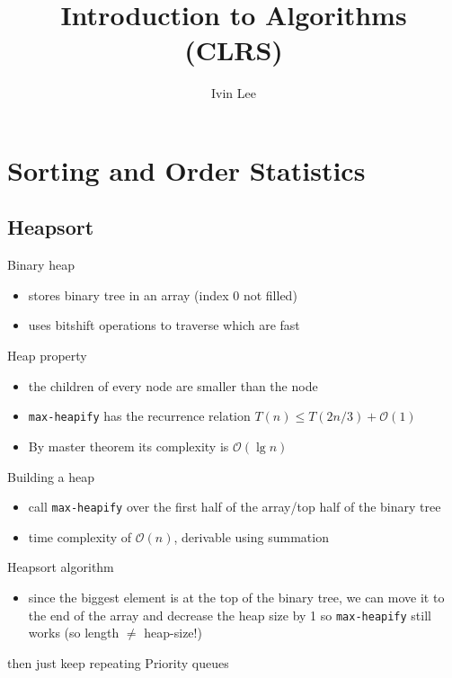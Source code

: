 \documentclass[12pt,a4paper]{article} %
\author{Ivin Lee}
\title{Introduction to Algorithms (CLRS)}
\begin{document}
\maketitle
\section{Sorting and Order Statistics}
	\subsection{Heapsort}
	Binary heap
		\begin{itemize}
		\item stores binary tree in an array (index 0 not filled)
		\item uses bitshift operations to traverse which are fast
		\end{itemize}
	Heap property
		\begin{itemize}
		\item the children of every node are smaller than the node
		\item \verb|max-heapify| has the recurrence relation $T(n) \leq T(2n/3)+\mathcal{O}(1)$
		\item By master theorem its complexity is $\mathcal{O}(\lg n)$
		\end{itemize}
	Building a heap
		\begin{itemize}
		\item call \verb|max-heapify| over the first half of the array/top half of the binary tree
		\item time complexity of $\mathcal{O}(n)$, derivable using summation
		\end{itemize}
	Heapsort algorithm
		\begin{itemize}
		\item since the biggest element is at the top of the binary tree, we can move it to the end of the array and decrease the heap size by 1 so \verb|max-heapify| still works (so length $\neq$ heap-size!)
		\end{itemize}then just keep repeating
	Priority queues
		\begin{itemize}
		
		\end{itemize}
\end{document}
